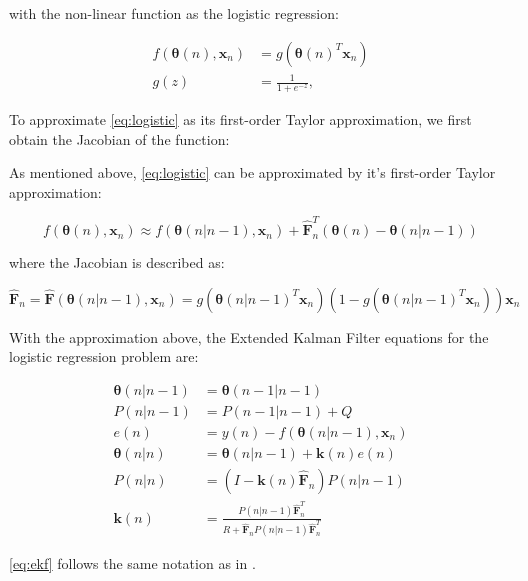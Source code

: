 \documentclass{article}
\begin{document}
with the non-linear function as the logistic regression:

\begin{equation}
    \begin{split}
        f(\pmb{\theta}(n), \pmb{x}_n) &= g(\pmb{\theta}(n)^T \pmb{x}_n)\\
        g(z) &= \frac{1}{1 + e^{-z}},
    \end{split}
    \label{eq:logistic}
\end{equation}

To approximate \cref{eq:logistic} as its first-order Taylor approximation, we first obtain the Jacobian of the function:

As mentioned above, \cref{eq:logistic} can be approximated by it's first-order Taylor approximation:

\begin{equation}
    f(\pmb{\theta}(n), \pmb{x}_n) \approx f(\pmb{\theta}(n|n-1), \pmb{x}_n) + \pmb{\hat{F}}_n^T (\pmb{\theta}(n) - \pmb{\theta}(n|n-1))
\end{equation}
    
where the Jacobian is described as:

\begin{equation}
     \pmb{\hat{F}}_n = \pmb{\hat{F}}(\pmb{\theta}(n|n-1), \pmb{x}_n) = g(\pmb{\theta}(n|n-1)^T \pmb{x}_n)(1 - g(\pmb{\theta}(n|n-1)^T \pmb{x}_n)) \pmb{x}_n
\end{equation}

With the approximation above, the Extended Kalman Filter equations for the logistic regression problem are:

\begin{equation}
    \begin{split}
        \pmb{\theta}(n|n-1) &= \pmb{\theta}(n-1|n-1)\\
        P(n|n-1) &= P(n-1|n-1) + Q\\
        e(n) &= y(n) - f(\pmb{\theta}(n|n-1), \pmb{x}_n)\\
        \pmb{\theta}(n|n) &= \pmb{\theta}(n|n-1) + \pmb{k}(n)e(n)\\
        P(n|n) &= (I - \pmb{k}(n) \pmb{\hat{F}}_n) P(n|n-1)\\
        \pmb{k}(n) &= \frac{P(n|n-1) \pmb{\hat{F}}_n^T}{R + \pmb{\hat{F}}_n P(n|n-1) \pmb{\hat{F}}_n^T}
    \end{split}
    \label{eq:ekf}
\end{equation}

\cref{eq:ekf} follows the same notation as in \cite{lab3}.
\end{document}

